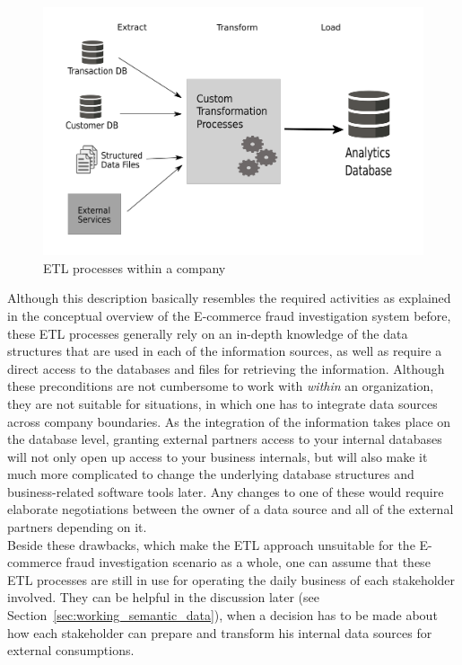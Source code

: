 \begin{figure}[H]
  \centering
  \includegraphics[width=0.9\columnwidth]{images/etl_process.pdf}
  \caption[ETL processes within a company]{\gls{ETL} processes within a company \citep[pg. 165]{wood2014linked}}
\label{fig:images_etl_process}
\end{figure}

Although this description basically resembles the required activities as explained in the conceptual overview of the \gls{E-commerce} fraud investigation system before, these \gls{ETL} processes generally rely on an in-depth knowledge of the data structures that are used in each of the information sources, as well as require a direct access to the databases and files for retrieving the information. Although these preconditions are not cumbersome to work with \emph{within} an organization, they are not suitable for situations, in which one has to integrate data sources across company boundaries. As the integration of the information takes place on the database level, granting external partners access to your internal databases will not only open up access to your business internals, but will also make it much more complicated to change the underlying database structures and business-related software tools later. Any changes to one of these would require elaborate negotiations between the owner of a data source and all of the external partners depending on it. \\

Beside these drawbacks, which make the \gls{ETL} approach unsuitable for the \gls{E-commerce} fraud investigation scenario as a whole, one can assume that these \gls{ETL} processes are still in use for operating the daily business of each stakeholder involved. They can be helpful in the discussion later (see Section~\ref{sec:working_semantic_data}), when a decision has to be made about how each stakeholder can prepare and transform his internal data sources for external consumptions.

